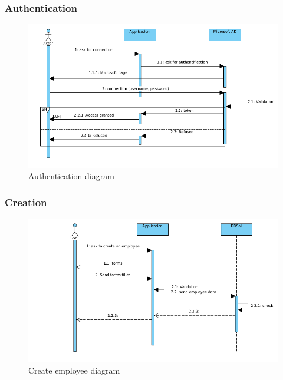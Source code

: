 \documentclass[12pt,a4paper,table,english]{article}
\begin{document}
	\subsubsection{Authentication}
	
		\begin{figure}[H]
		\includegraphics[width=150mm]{Image/seq-authentication}
		\caption{Authentication diagram}
		\label{fig:Authentication diagram}
		\end{figure}
	
	\subsubsection{Creation}
	
	\begin{figure}[H]
		\includegraphics[width=150mm]{Image/seq-createemp}
		\caption{Create employee diagram}
		\label{fig:Create employee diagram}
	\end{figure}
	
\end{document}
